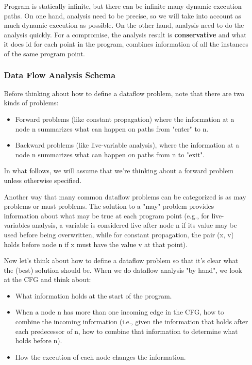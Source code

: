 Program is statically infinite, but there can be infinite many dynamic execution paths. On one hand, analysis
 need to be precise, so we will take into account as much dynamic execution as possible. On the other hand, analysis
 need to do the analysis quickly. For a compromise, the analysis result is \textbf{conservative} and what it does id for each 
 point in the program, combines information of all the instances of the same program point.





\subsubsection{Data Flow Analysis Schema}
Before thinking about how to define a dataflow problem, note that there are two kinds of problems:
\begin{itemize}
    \item Forward problems (like constant propagation) where the information at a node n summarizes what can happen on paths from "enter" to n.
    \item Backward problems (like live-variable analysis), where the information at a node n summarizes what can happen on paths from n to "exit".
\end{itemize}    

In what follows, we will assume that we're thinking about a forward problem unless otherwise specified.

Another way that many common dataflow problems can be categorized is as may problems or must problems. 
The solution to a "may" problem provides information about what may be true at each program point (e.g., 
for live-variables analysis, a variable is considered live after node n if its value may be used before 
being overwritten, while for constant propagation, the pair (x, v) holds before node n if x must have the value v at that point).

Now let's think about how to define a dataflow problem so that it's clear what the (best) solution should be. 
When we do dataflow analysis "by hand", we look at the CFG and think about:

\begin{itemize}
    \item What information holds at the start of the program.
    \item When a node n has more than one incoming edge in the CFG, how to combine the incoming 
    information (i.e., given the information that holds after each predecessor of n, how to 
    combine that information to determine what holds before n).
    \item How the execution of each node changes the information.
\end{itemize}    

